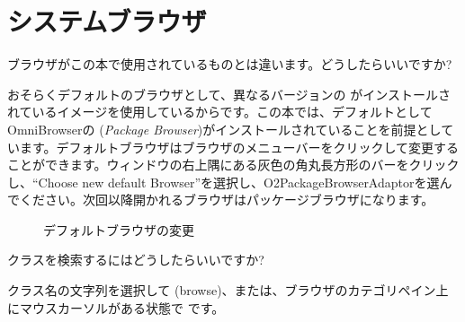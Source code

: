 \documentclass[a4paper,10pt,twoside]{book}
\begin{document}
\section{システムブラウザ}


\begin{faq}
ブラウザがこの本で使用されているものとは違います。どうしたらいいですか?
\end{faq}
\answer
おそらくデフォルトのブラウザとして、異なるバージョンの  がインストールされているイメージを使用しているからです。この本では、デフォルトとして OmniBrowserの (\emph{Package Browser})がインストールされていることを前提としています。デフォルトブラウザはブラウザのメニューバーをクリックして変更することができます。ウィンドウの右上隅にある灰色の角丸長方形のバーをクリックし、“Choose new default Browser”を選択し、O2PackageBrowserAdaptorを選んでください。次回以降開かれるブラウザはパッケージブラウザになります。

\begin{figure}[tbh]
	\centering
	\hfill
	\hfill
	\caption{デフォルトブラウザの変更}
\end{figure}

\begin{faq}
クラスを検索するにはどうしたらいいですか?
\end{faq}
\answer
クラス名の文字列を選択して  (browse)、または、ブラウザのカテゴリペイン上にマウスカーソルがある状態で  です。
\end{document}
